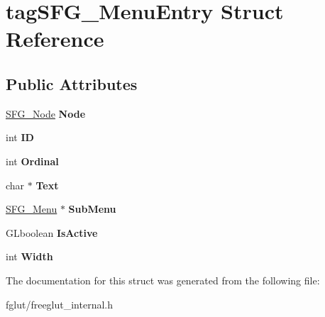 \hypertarget{structtag_s_f_g___menu_entry}{}\section{tag\+S\+F\+G\+\_\+\+Menu\+Entry Struct Reference}
\label{structtag_s_f_g___menu_entry}
\subsection*{Public Attributes}
\begin{DoxyCompactItemize}
\item 
\hyperlink{structtag_s_f_g___node}{S\+F\+G\+\_\+\+Node} {\bfseries Node}\hypertarget{structtag_s_f_g___menu_entry_a52f441c4279791f897a74b3a0d0ab75f}{}\label{structtag_s_f_g___menu_entry_a52f441c4279791f897a74b3a0d0ab75f}

\item 
int {\bfseries ID}\hypertarget{structtag_s_f_g___menu_entry_a8b7775e0cc478b3a28580b4ac3ef9d47}{}\label{structtag_s_f_g___menu_entry_a8b7775e0cc478b3a28580b4ac3ef9d47}

\item 
int {\bfseries Ordinal}\hypertarget{structtag_s_f_g___menu_entry_a1d44f214ef51a363751bb5c06d627360}{}\label{structtag_s_f_g___menu_entry_a1d44f214ef51a363751bb5c06d627360}

\item 
char $\ast$ {\bfseries Text}\hypertarget{structtag_s_f_g___menu_entry_a7db692ea4092deaa966b974b85dd078a}{}\label{structtag_s_f_g___menu_entry_a7db692ea4092deaa966b974b85dd078a}

\item 
\hyperlink{structtag_s_f_g___menu}{S\+F\+G\+\_\+\+Menu} $\ast$ {\bfseries Sub\+Menu}\hypertarget{structtag_s_f_g___menu_entry_a49a462aef5fda0726f9342e35812d8d6}{}\label{structtag_s_f_g___menu_entry_a49a462aef5fda0726f9342e35812d8d6}

\item 
G\+Lboolean {\bfseries Is\+Active}\hypertarget{structtag_s_f_g___menu_entry_af808c1b9e6a27def415f32450bc19f8e}{}\label{structtag_s_f_g___menu_entry_af808c1b9e6a27def415f32450bc19f8e}

\item 
int {\bfseries Width}\hypertarget{structtag_s_f_g___menu_entry_a704ec8c9592875c7a41b74d58ece35b0}{}\label{structtag_s_f_g___menu_entry_a704ec8c9592875c7a41b74d58ece35b0}

\end{DoxyCompactItemize}


The documentation for this struct was generated from the following file\+:\begin{DoxyCompactItemize}
\item 
fglut/freeglut\+\_\+internal.\+h\end{DoxyCompactItemize}
